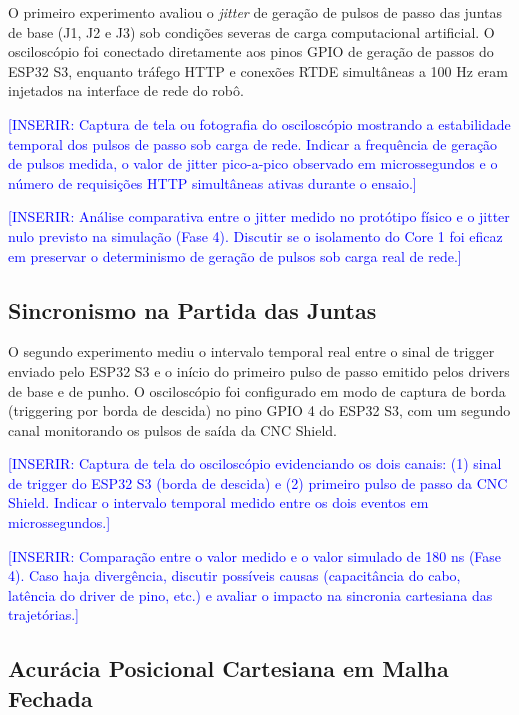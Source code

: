 O primeiro experimento avaliou o \textit{jitter} de geração de pulsos de passo das juntas de base (J1, J2 e J3) sob condições severas de carga computacional artificial. O osciloscópio foi conectado diretamente aos pinos GPIO de geração de passos do ESP32 S3, enquanto tráfego HTTP e conexões RTDE simultâneas a 100 Hz eram injetados na interface de rede do robô.

\textcolor{blue}{[INSERIR: Captura de tela ou fotografia do osciloscópio mostrando a estabilidade temporal dos pulsos de passo sob carga de rede. Indicar a frequência de geração de pulsos medida, o valor de jitter pico-a-pico observado em microssegundos e o número de requisições HTTP simultâneas ativas durante o ensaio.]}

\textcolor{blue}{[INSERIR: Análise comparativa entre o jitter medido no protótipo físico e o jitter nulo previsto na simulação (Fase 4). Discutir se o isolamento do Core 1 foi eficaz em preservar o determinismo de geração de pulsos sob carga real de rede.]}

\subsection{Sincronismo na Partida das Juntas}
\label{subsec:testes_sincronismo}

O segundo experimento mediu o intervalo temporal real entre o sinal de trigger enviado pelo ESP32 S3 e o início do primeiro pulso de passo emitido pelos drivers de base e de punho. O osciloscópio foi configurado em modo de captura de borda (triggering por borda de descida) no pino GPIO 4 do ESP32 S3, com um segundo canal monitorando os pulsos de saída da CNC Shield.

\textcolor{blue}{[INSERIR: Captura de tela do osciloscópio evidenciando os dois canais: (1) sinal de trigger do ESP32 S3 (borda de descida) e (2) primeiro pulso de passo da CNC Shield. Indicar o intervalo temporal medido entre os dois eventos em microssegundos.]}

\textcolor{blue}{[INSERIR: Comparação entre o valor medido e o valor simulado de 180 ns (Fase 4). Caso haja divergência, discutir possíveis causas (capacitância do cabo, latência do driver de pino, etc.) e avaliar o impacto na sincronia cartesiana das trajetórias.]}

\subsection{Acurácia Posicional Cartesiana em Malha Fechada}
\label{subsec:testes_acuracia}

